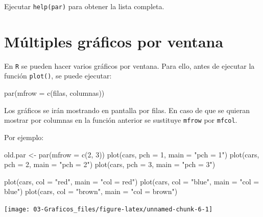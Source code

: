 \documentclass[
]{book}
\newenvironment{Shaded}{\begin{snugshade}}{\end{snugshade}}
\newcommand{\AttributeTok}[1]{\textcolor[rgb]{0.77,0.63,0.00}{#1}}
\newcommand{\DecValTok}[1]{\textcolor[rgb]{0.00,0.00,0.81}{#1}}
\newcommand{\FunctionTok}[1]{\textcolor[rgb]{0.00,0.00,0.00}{#1}}
\newcommand{\NormalTok}[1]{#1}
\newcommand{\OtherTok}[1]{\textcolor[rgb]{0.56,0.35,0.01}{#1}}
\newcommand{\StringTok}[1]{\textcolor[rgb]{0.31,0.60,0.02}{#1}}
\theoremstyle{break}
\theoremstyle{nonumberplain}
\begin{document}
Ejecutar \texttt{help(par)} para obtener la lista completa.

\hypertarget{mfrow-plot}{%
\section{Múltiples gráficos por ventana}\label{mfrow-plot}}

En \texttt{R} se pueden hacer varios gráficos por ventana.
Para ello, antes de ejecutar la función \texttt{plot()}, se puede ejecutar:

\begin{Shaded}
\begin{Highlighting}[]
\FunctionTok{par}\NormalTok{(}\AttributeTok{mfrow =} \FunctionTok{c}\NormalTok{(filas, columnas))}
\end{Highlighting}
\end{Shaded}

Los gráficos se irán mostrando en pantalla por filas. En caso de que se
quieran mostrar por columnas en la función anterior se sustituye \texttt{mfrow}
por \texttt{mfcol}.

Por ejemplo:

\begin{Shaded}
\begin{Highlighting}[]
\NormalTok{old.par }\OtherTok{\textless{}{-}} \FunctionTok{par}\NormalTok{(}\AttributeTok{mfrow =} \FunctionTok{c}\NormalTok{(}\DecValTok{2}\NormalTok{, }\DecValTok{3}\NormalTok{))}
\FunctionTok{plot}\NormalTok{(cars, }\AttributeTok{pch =} \DecValTok{1}\NormalTok{, }\AttributeTok{main =} \StringTok{"pch = 1"}\NormalTok{)}
\FunctionTok{plot}\NormalTok{(cars, }\AttributeTok{pch =} \DecValTok{2}\NormalTok{, }\AttributeTok{main =} \StringTok{"pch = 2"}\NormalTok{)}
\FunctionTok{plot}\NormalTok{(cars, }\AttributeTok{pch =} \DecValTok{3}\NormalTok{, }\AttributeTok{main =} \StringTok{"pch = 3"}\NormalTok{)}

\FunctionTok{plot}\NormalTok{(cars, }\AttributeTok{col =} \StringTok{"red"}\NormalTok{, }\AttributeTok{main =} \StringTok{"col = red"}\NormalTok{)}
\FunctionTok{plot}\NormalTok{(cars, }\AttributeTok{col =} \StringTok{"blue"}\NormalTok{, }\AttributeTok{main =} \StringTok{"col = blue"}\NormalTok{)}
\FunctionTok{plot}\NormalTok{(cars, }\AttributeTok{col =} \StringTok{"brown"}\NormalTok{, }\AttributeTok{main =} \StringTok{"col = brown"}\NormalTok{)}
\end{Highlighting}
\end{Shaded}

\begin{center}\texttt{[image: 03-Graficos\_files/figure-latex/unnamed-chunk-6-1]} \end{center}
\end{document}

